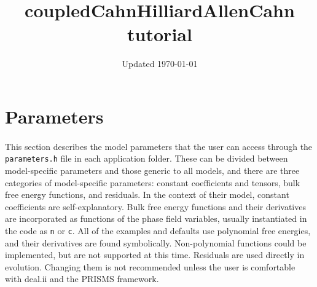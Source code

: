 \documentclass[11pt]{article}
\title{coupledCahnHilliardAllenCahn tutorial}
\date{Updated \today}
\begin{document}
\maketitle

\section{Parameters}
\paragraph{}
This section describes the model parameters that the user can access through the \texttt{parameters.h} file in each application folder.  These can be divided between model-specific parameters and those generic to all models, and there are three categories of model-specific parameters: constant coefficients and tensors, bulk free energy functions, and residuals.  In the context of their model, constant coefficients are self-explanatory.  Bulk free energy functions and their derivatives are incorporated as functions of the phase field variables, usually instantiated in the code as \texttt{n} or \texttt{c}.  All of the examples and defaults use polynomial free energies, and their derivatives are found symbolically.  Non-polynomial functions could be implemented, but are not supported at this time.  Residuals are used directly in evolution.  Changing them is not recommended unless the user is comfortable with deal.ii and the PRISMS framework.
\end{document}
